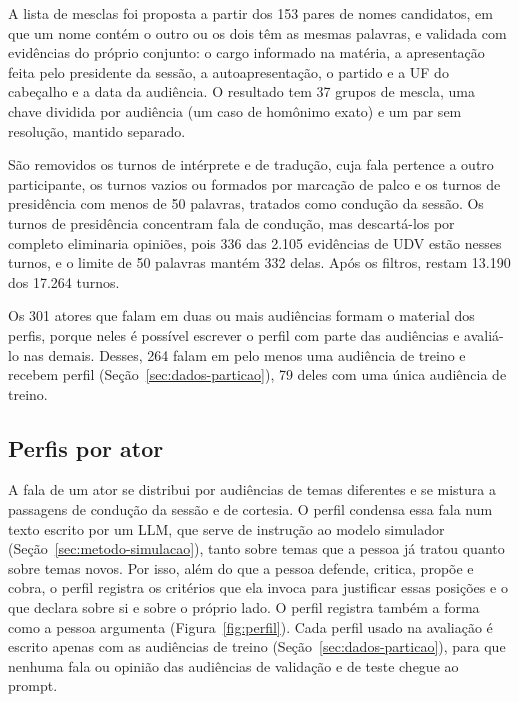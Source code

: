 A lista de mesclas foi proposta a partir dos 153 pares de nomes candidatos, em que um nome contém o
outro ou os dois têm as mesmas palavras, e validada com evidências do próprio conjunto: o cargo
informado na matéria, a apresentação feita pelo presidente da sessão, a autoapresentação, o partido e
a UF do cabeçalho e a data da audiência. O resultado tem 37 grupos de mescla, uma chave dividida por
audiência (um caso de homônimo exato) e um par sem resolução, mantido separado.

São removidos os turnos de intérprete e de tradução, cuja fala pertence a outro participante, os
turnos vazios ou formados por marcação de palco e os turnos de presidência com menos de 50 palavras,
tratados como condução da sessão. Os turnos de presidência concentram fala de condução, mas
descartá-los por completo eliminaria opiniões, pois 336 das 2.105 evidências de UDV estão nesses
turnos, e o limite de 50 palavras mantém 332 delas. Após os filtros, restam 13.190 dos 17.264 turnos.

Os 301 atores que falam em duas ou mais audiências formam o material dos perfis, porque neles é
possível escrever o perfil com parte das audiências e avaliá-lo nas demais. Desses, 264 falam em
pelo menos uma audiência de treino e recebem perfil (Seção~\ref{sec:dados-particao}), 79 deles com
uma única audiência de treino.

\subsection{Perfis por ator}
\label{sec:metodo-perfis}

A fala de um ator se distribui por audiências de temas diferentes e se mistura a passagens de
condução da sessão e de cortesia. O perfil condensa essa fala num texto escrito por um LLM, que serve
de instrução ao modelo simulador (Seção~\ref{sec:metodo-simulacao}), tanto sobre temas que a
pessoa já tratou quanto sobre temas novos. Por isso, além do que a pessoa defende, critica, propõe e
cobra, o perfil registra os critérios que ela invoca para justificar essas posições e o que declara
sobre si e sobre o próprio lado. O perfil registra também a forma como a pessoa argumenta
(Figura~\ref{fig:perfil}). Cada perfil usado na avaliação é escrito apenas com as audiências de
treino (Seção~\ref{sec:dados-particao}), para que nenhuma fala ou opinião das audiências de validação
e de teste chegue ao prompt.




